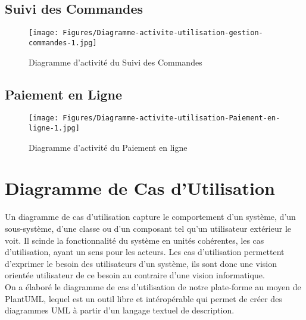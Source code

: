 \vspace{.5cm}
\subsection{Suivi des Commandes}
\vspace{.5cm}

\begin{figure}[H]
    \centering
    \texttt{[image: Figures/Diagramme-activite-utilisation-gestion-commandes-1.jpg]}
    \caption{Diagramme d'activité du Suivi des Commandes}
\end{figure}


\vspace{.5cm}
\subsection{Paiement en Ligne}
\vspace{.5cm}

\begin{figure}[H]
    \centering
    \texttt{[image: Figures/Diagramme-activite-utilisation-Paiement-en-ligne-1.jpg]}
    \caption{Diagramme d'activité du Paiement en ligne}
\end{figure}

\vspace{1cm}
\section{Diagramme de Cas d'Utilisation}
\vspace{.5cm}
Un diagramme de cas d’utilisation capture le comportement d’un système, d’un sous-système, d’une classe ou d’un composant tel qu’un utilisateur extérieur le voit. Il scinde la fonctionnalité du système en unités cohérentes, les cas d’utilisation, ayant un sens pour les acteurs. Les cas d’utilisation permettent d’exprimer le besoin des utilisateurs d’un système, ils sont donc une vision orientée utilisateur de ce besoin au contraire d’une vision informatique.
\vspace{.3cm}\\
On a élaboré le diagramme de cas d'utilisation de notre plate-forme au moyen de PlantUML, lequel est un outil libre et intéropérable qui permet de créer des diagrammes UML à partir d'un langage textuel de description.

\vspace{.4cm}

